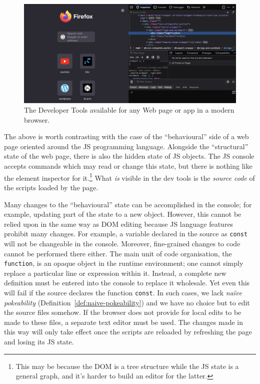 \documentclass[ twoside,openright,titlepage,numbers=noenddot,headinclude,footinclude,cleardoublepage=empty,abstract=on,
                BCOR=5mm,paper=a4,fontsize=11pt
                ]{scrreprt}
\theoremstyle{definition}
\begin{document}
\begin{figure}
\centering
\includegraphics[width=\linewidth]{web-dev-tools.png}
\caption[Web Developer Tools]{The Developer Tools available for any Web page or app in a modern browser.}
\label{fig:web-dev-tools}
\end{figure}

The above is worth contrasting with the case of the ``behavioural'' side
of a web page oriented around the \ac{JS} programming language.
Alongside the ``structural'' state of the web page, there is also the
hidden state of \ac{JS} objects. The \ac{JS} console accepts commands
which may read or change this state, but there is nothing like the
element inspector for it.\footnote{This may be because the \ac{DOM} is a
  tree structure while the \ac{JS} state is a general graph, and it's
  harder to build an editor for the latter.} What \emph{is} visible in
the dev tools is the \emph{source code} of the scripts loaded by the
page.

Many changes to the ``behavioural'' state can be accomplished in the
console; for example, updating part of the state to a new object.
However, this cannot be relied upon in the same way as \ac{DOM} editing
because \ac{JS} language features prohibit many changes. For example, a
variable declared in the source as \texttt{const} will not be changeable
in the console. Moreover, fine-grained changes to code cannot be
performed there either. The main unit of code organisation, the
\texttt{function}, is an opaque object in the runtime environment; one
cannot simply replace a particular line or expression within it.
Instead, a complete new definition must be entered into the console to
replace it wholesale. Yet even this will fail if the source declares the
function \texttt{const}. In such cases, we lack \emph{naïve pokeability}
(Definition~\ref{def:naive-pokeability}) and we have no choice but to
edit the source files somehow. If the browser does not provide for local
edits to be made to these files, a separate text editor must be used.
The changes made in this way will only take effect once the scripts are
reloaded by refreshing the page and losing its \ac{JS} state.
\end{document}

